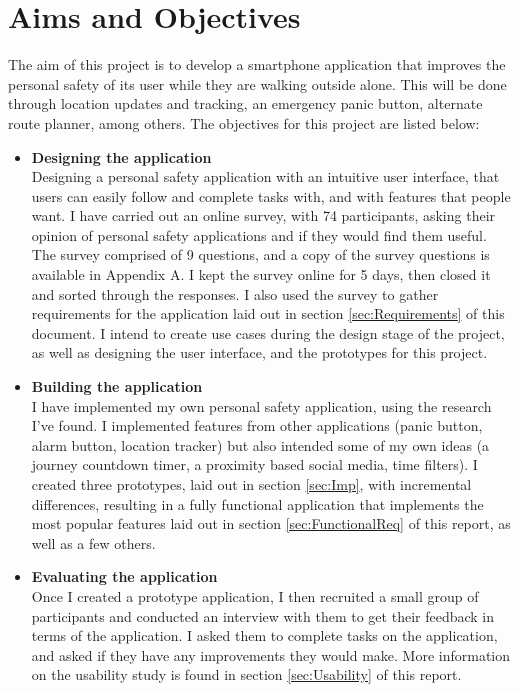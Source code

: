 \documentclass[a4paper]{report}
\begin{document}
   \section{Aims and Objectives}
   \label{sec:AimsAndObj}
    The aim of this project is to develop a smartphone application that improves the personal safety of its user while they are walking outside alone. This will be done through location updates and tracking, an emergency panic button, alternate route planner, among others. The objectives for this project are listed below:
    \\ 
    \begin{itemize}
    	\item \textbf{Designing the application}
    	\\
    Designing a personal safety application with an intuitive user interface, that users can easily follow and complete tasks with, and with features that people want. I have carried out an online survey, with 74 participants, asking their opinion of personal safety applications and if they would find them useful. The survey comprised of 9 questions, and a copy of the survey questions is available in Appendix A. I kept the survey online for 5 days, then closed it and sorted through the responses. I also used the survey to gather requirements for the application laid out in section \ref{sec:Requirements} of this document. I intend to create use cases during the design stage of the project, as well as designing the user interface, and the prototypes for this project. 
    \\ \item \textbf{Building the application}\\
	I have implemented my own personal safety application, using the research I've found.  I implemented features from other applications (panic button, alarm button, location tracker) but also intended
	some of my own ideas (a journey countdown timer, a proximity based social media, time filters). I created three prototypes, laid out in section \ref{sec:Imp}, with incremental differences, resulting in a fully functional application that implements the most popular features laid out in section \ref{sec:FunctionalReq} of this report, as well as a few others. 
    \\ \item \textbf{Evaluating the application}\\
    Once I created a prototype application, I then recruited a small group of participants and conducted an interview with them to get their feedback in terms of the application. I asked them to complete tasks on the application, and asked if they have any improvements they would make. More information on the usability study is found in section \ref{sec:Usability} of this report. 
\end{itemize}
\end{document}
